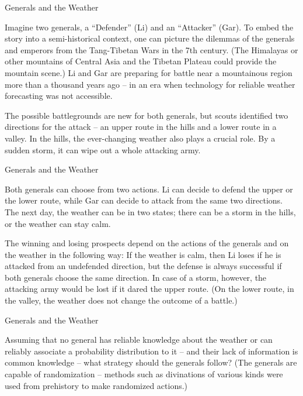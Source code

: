 \documentclass{beamer}
\theoremstyle{definition}
\begin{document}
\begin{frame}{Generals and the Weather }

Imagine two generals, a ``Defender'' (Li) and an ``Attacker'' (Gar). To embed the story into a semi-historical context, one can picture the dilemmas of the generals and emperors from the Tang-Tibetan Wars in the 7th century. (The Himalayas or other mountains of Central Asia and the Tibetan Plateau could provide the mountain scene.) Li and Gar are preparing for battle near a mountainous region more than a thousand years ago – in an era when technology for reliable weather forecasting was not accessible.

The possible battlegrounds are new for both generals, but scouts identified two directions for the attack – an upper route in the hills and a lower route in a valley. In the hills, the ever-changing weather also plays a crucial role. By a sudden storm, it can wipe out a whole attacking army.
    
\end{frame}

\begin{frame}{Generals and the Weather }

Both generals can choose from two actions. Li can decide to defend the upper or the lower route, while Gar can decide to attack from the same two directions. The next day, the weather can be in two states; there can be a storm in the hills, or the weather can stay calm.

The winning and losing prospects depend on the actions of the generals and on the weather in the following way: If the weather is calm, then Li loses if he is attacked from an undefended direction, but the defense is always successful if both generals choose the same direction. In case of a storm, however, the attacking army would be lost if it dared the upper route. (On the lower route, in the valley, the weather does not change the outcome of a battle.)
    
\end{frame}

\begin{frame}{Generals and the Weather }

Assuming that no general has reliable knowledge about the weather or can reliably associate a probability distribution to it – and their lack of information is common knowledge – what strategy should the generals follow? (The generals are capable of randomization – methods such as divinations of various kinds were used from prehistory to make randomized actions.)
    
\end{frame}
\end{document}
